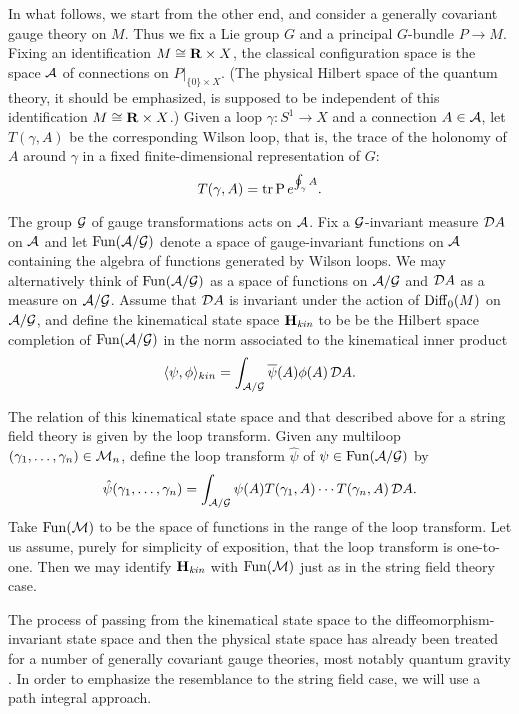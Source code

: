 \documentclass[12pt]{article}
\newcommand{\maps}{\colon}
\newcommand{\A}{{\cal A}}
\newcommand{\G}{{\cal G}}
\newcommand{\M}{{\cal M}}
\newcommand{\D}{{\cal D}}
\renewcommand{\H}{{\bf H}}
\newcommand{\R}{{\bf R}}
\newcommand{\tr}{{\rm tr}}
\newcommand{\Diff}{{\rm Diff}}
\newcommand{\Fun}{{\rm Fun}}
\begin{document}
In what follows, we start from the other end, and
consider a generally covariant gauge theory on $M$.
Thus we fix a Lie group $G$ and a principal $G$-bundle $P \to M$.
Fixing an identification $M \cong \R \times X$, the
classical configuration space is the space $\A$ of
connections on $P|_{\{0\} \times X}$.  (The physical Hilbert space of
the quantum theory, it should be emphasized, is supposed to be
independent of this identification $M \cong \R \times X$.)
Given a loop $\gamma \maps S^1 \to X$ and a connection $A\in \A$,
let $T(\gamma,A)$ be the corresponding Wilson loop, that is,
the trace of the holonomy of $A$ around $\gamma$ in a fixed
finite-dimensional representation of $G$:
\[           T(\gamma,A) = \tr\, {\rm P}\, e^{ \oint_\gamma A } . \]

The group $\G$ of gauge transformations acts on $\A$. Fix a
$\G$-invariant measure $\D A$
on $\A$ and let $\Fun(\A/\G)$ denote a space of gauge-invariant
functions on $\A$
containing the algebra of functions generated by Wilson loops.   We may
alternatively think of $\Fun(\A/\G)$ as a space of
functions on $\A/\G$ and $\D A$ as a measure on $\A/\G$.
Assume that $\D A$ is invariant under the action of
$\Diff_0(M)$ on $\A/\G$, and define the kinematical state space $\H_{\textit{kin}}$
to be be the Hilbert space completion of $\Fun(\A/\G)$ in the norm
associated to the kinematical inner product
\[ \langle \psi,\phi\rangle_{kin} = \int_{\A/\G}
\overline\psi(A) \phi(A) \, \D A  .\]

The relation of this kinematical state space and that described above
for a string field theory is given by the loop transform.
Given any multiloop $(\gamma_1, \dots, \gamma_n) \in \M_n$, define the loop
transform $\hat\psi$ of $\psi\in \Fun(\A/\G)$ by
\[            \hat\psi(\gamma_1, \dots, \gamma_n) =
\int_{\A/\G} \psi(A) T(\gamma_1,A) \cdots T(\gamma_n,A) \, \D A  .\]
Take $\Fun(\M)$ to be the space of functions in the range of the loop
transform.  Let us assume, purely for simplicity of exposition, that the
loop transform is one-to-one.  Then we may identify $\H_{\textit{kin}}$ with
$\Fun(\M)$ just as in the string field theory case.

The process of passing from the kinematical state space to the
diffeomorphism-invariant state space and then the physical state space
has already been treated for a number of generally covariant gauge
theories, most notably quantum gravity \cite{A,Rovelli,RS}.
In order to emphasize the resemblance to the
string field case, we will use a path integral approach.
\end{document}
